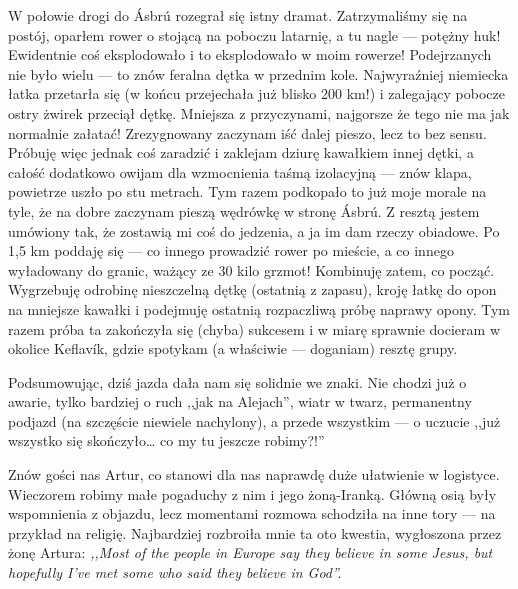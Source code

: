 W połowie drogi do Ásbrú rozegrał się istny dramat. Zatrzymaliśmy się na postój, oparłem rower o stojącą na poboczu latarnię, a tu nagle --- potężny huk! Ewidentnie coś eksplodowało i to eksplodowało w moim rowerze! Podejrzanych nie było wielu --- to znów feralna dętka w przednim kole. Najwyraźniej niemiecka łatka przetarła się (w końcu przejechała już blisko 200 km!) i zalegający pobocze ostry żwirek przeciął dętkę. Mniejsza z przyczynami, najgorsze że tego nie ma jak normalnie załatać! Zrezygnowany zaczynam iść dalej pieszo, lecz to bez sensu. Próbuję więc jednak coś zaradzić i zaklejam dziurę kawałkiem innej dętki, a całość dodatkowo owijam dla wzmocnienia taśmą izolacyjną --- znów klapa, powietrze uszło po stu metrach. Tym razem podkopało to już moje morale na tyle, że na dobre zaczynam pieszą wędrówkę w stronę Ásbrú. Z resztą jestem umówiony tak, że zostawią mi coś do jedzenia, a ja im dam rzeczy obiadowe. Po 1,5 km poddaję się --- co innego prowadzić rower po mieście, a co innego wyładowany do granic, ważący ze 30 kilo grzmot! Kombinuję zatem, co począć. Wygrzebuję odrobinę nieszczelną dętkę (ostatnią z zapasu), kroję łatkę do opon na mniejsze kawałki i podejmuję ostatnią rozpaczliwą próbę naprawy opony. Tym razem próba ta zakończyła się (chyba) sukcesem i w miarę sprawnie docieram w okolice Keflavík, gdzie spotykam (a właściwie --- doganiam) resztę grupy.

Podsumowując, dziś jazda dała nam się solidnie we znaki. Nie chodzi już o awarie, tylko bardziej o ruch ,,jak na Alejach'', wiatr w twarz, permanentny podjazd (na szczęście niewiele nachylony), a przede wszystkim --- o uczucie ,,już wszystko się skończyło… co my tu jeszcze robimy?!''

Znów gości nas Artur, co stanowi dla nas naprawdę duże ułatwienie w logistyce. Wieczorem robimy małe pogaduchy z nim i jego żoną-Iranką. Główną osią były wspomnienia z objazdu, lecz momentami rozmowa schodziła na inne tory --- na przykład na religię. Najbardziej rozbroiła mnie ta oto kwestia, wygłoszona przez żonę Artura: \emph{,,Most of the people in Europe say they believe in some Jesus, but hopefully I’ve met some who said they believe in God''.}

